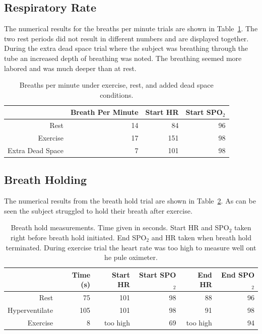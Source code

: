 \documentclass[12pt]{article}
\newcommand{\spo}{SPO$_2$}
\begin{document}
\subsection{Respiratory Rate}
The numerical results for the breaths per minute trials are shown in Table~\ref{tab:bpm}. The two rest periods did not result in different numbers and are displayed together. During the extra dead space trial where the subject was breathing through the tube an increased depth of breathing was noted. The breathing seemed more labored and was much deeper than at rest.
\begin{table}[H]
	\centering{}
	\caption{Breaths per minute under exercise, rest, and added dead space conditions. }
	\label{tab:bpm}
	\begin{tabular}{|r|r|r|r|}
		\hline
		& Breath Per Minute & Start HR & Start \spo{} \\
		\hline
		
		Rest&14 & 84 &96\\
		\hline
		Exercise&17 & 151 &98\\
		\hline
		Extra Dead Space&7 & 101 &98 \\
		\hline
		
		
	\end{tabular}
\end{table}


\subsection{Breath Holding}

The numerical results from the breath hold trial are shown in Table~\ref{tab:bhold}. As can be seen the subject struggled to hold their breath after exercise.

\begin{table}[H]
	\centering{}
	\caption{Breath hold measurements. Time given in seconds. Start HR and \spo{} taken right before breath hold initiated. End \spo{} and HR taken when breath hold terminated. During exercise trial the heart rate was too high to measure well ont he pule oximeter. }
	\label{tab:bhold}
	\begin{tabular}{|r|r|r|r|r|r|}
		\hline
		 & Time (s) & Start HR & Start \spo{}&End HR & End \spo{} \\
		\hline
		
		Rest&75 & 101 &98 & 88 & 96\\
		\hline
		Hyperventilate&105  & 101 &98 & 91 & 98\\
		\hline
		Exercise&8 & too high &69 & too high & 94\\
		\hline
		
		
	\end{tabular}
\end{table}
\end{document}
